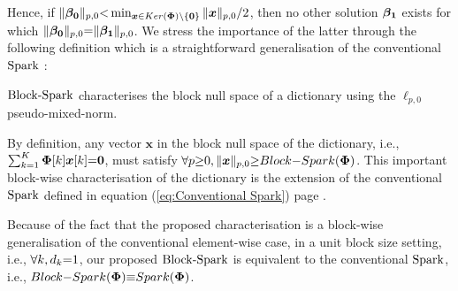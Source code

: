 Hence, if $\Vert \boldsymbol{\beta_0} \Vert_{p,0} {<} \min_{\boldsymbol{x} {\in} Ker(\boldsymbol{\Phi}) \backslash\{\boldsymbol{0}\}} \Vert \boldsymbol{x} \Vert_{p,0}/2$, then no other solution $\boldsymbol{\beta_1}$ exists for which $\Vert \boldsymbol{\beta_0} \Vert_{p,0} {=} \Vert \boldsymbol{\beta_1} \Vert_{p,0}$. We stress the importance of the latter through the following definition which is a straightforward generalisation of the conventional $\mathrm{Spark}$ \cite{Gribonval2003a,Donoho2003}:

$\mathrm{Block\text{{-}}Spark}$ characterises the block null space of a dictionary using the $\ell_{p,0}$ pseudo-mixed-norm.

By definition, any vector $\boldsymbol{x}$ in the block null space of the dictionary, i.e., $\sum_{k=1}^{K} \boldsymbol{\Phi}[k]\boldsymbol{x}[k] {=} \boldsymbol{0}$, must satisfy $\forall p {\geq} 0, \Vert \boldsymbol{x} \Vert_{p,0} {\geq} Block{-}Spark(\boldsymbol{\Phi})$. 
This important block-wise characterisation of the dictionary is the extension of the conventional $\mathrm{Spark}$ defined in equation (\ref{eq:Conventional Spark}) page \pageref{eq:Conventional Spark}.

Because of the fact that the proposed characterisation is a block-wise generalisation of the conventional element-wise case, in a unit block size setting, i.e., $\forall k, d_k {=} 1$, our proposed $\mathrm{Block\text{{-}}Spark}$ is equivalent to the conventional $\mathrm{Spark}$, i.e., $Block{-}Spark(\boldsymbol{\Phi}) {\equiv}Spark(\boldsymbol{\Phi})$.


